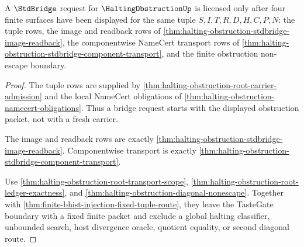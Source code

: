 \begin{theorem}
\label{thm:halting-obstruction-stdbridge-tastegate-boundary}
A $\StdBridge$ request for $\HaltingObstructionUp$ is licensed only after four
finite surfaces have been displayed for the same tuple $S,I,T,R,D,H,C,P,N$:
the tuple rows, the image and readback rows of
\autoref{thm:halting-obstruction-stdbridge-image-readback}, the componentwise
NameCert transport rows of
\autoref{thm:halting-obstruction-stdbridge-component-transport}, and the
finite obstruction non-escape boundary.
\end{theorem}
\begin{proof}
The tuple rows are supplied by
\autoref{thm:halting-obstruction-root-carrier-admission} and the local
NameCert obligations of \autoref{thm:halting-obstruction-namecert-obligations}.
Thus a bridge request starts with the displayed obstruction packet, not with a
fresh carrier.

The image and readback rows are exactly
\autoref{thm:halting-obstruction-stdbridge-image-readback}. Componentwise
transport is exactly
\autoref{thm:halting-obstruction-stdbridge-component-transport}.

Use \autoref{thm:halting-obstruction-root-transport-scope},
\autoref{thm:halting-obstruction-root-ledger-exactness}, and
\autoref{thm:halting-obstruction-diagonal-nonescape}. Together with
\autoref{thm:finite-bhist-injection-fixed-tuple-route}, they leave the
TasteGate boundary with a fixed finite packet and exclude a global halting
classifier, unbounded search, host divergence oracle, quotient equality, or
second diagonal route.
\end{proof}


